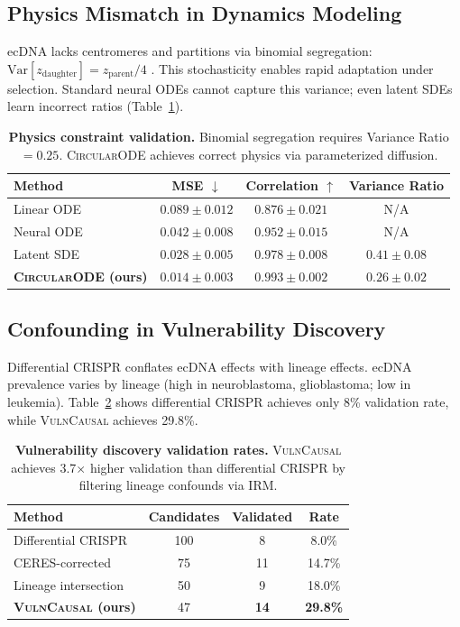 \documentclass{article}
\newcommand{\circularode}{\textsc{CircularODE}}
\newcommand{\vulncausal}{\textsc{VulnCausal}}
\begin{document}
\subsection{Physics Mismatch in Dynamics Modeling}
\label{sec:physics_mismatch}

ecDNA lacks centromeres and partitions via binomial segregation: $\text{Var}[z_{\text{daughter}}] = z_{\text{parent}}/4$ \citep{lange_2022_mathematical}. This stochasticity enables rapid adaptation under selection. Standard neural ODEs cannot capture this variance; even latent SDEs learn incorrect ratios (Table~\ref{tab:physics}).

\begin{table}[t]
\caption{\textbf{Physics constraint validation.} Binomial segregation requires Variance Ratio $= 0.25$. \circularode{} achieves correct physics via parameterized diffusion.}
\label{tab:physics}
\centering
\small
\begin{tabular}{@{}lccc@{}}
\toprule
Method & MSE $\downarrow$ & Correlation $\uparrow$ & Variance Ratio \\
\midrule
Linear ODE & $0.089 \pm 0.012$ & $0.876 \pm 0.021$ & N/A \\
Neural ODE & $0.042 \pm 0.008$ & $0.952 \pm 0.015$ & N/A \\
Latent SDE & $0.028 \pm 0.005$ & $0.978 \pm 0.008$ & $0.41 \pm 0.08$ \\
\textbf{\circularode{} (ours)} & $\mathbf{0.014 \pm 0.003}$ & $\mathbf{0.993 \pm 0.002}$ & $\mathbf{0.26 \pm 0.02}$ \\
\bottomrule
\end{tabular}
\end{table}

\subsection{Confounding in Vulnerability Discovery}
\label{sec:confounding}

Differential CRISPR conflates ecDNA effects with lineage effects. ecDNA prevalence varies by lineage (high in neuroblastoma, glioblastoma; low in leukemia). Table~\ref{tab:confounding} shows differential CRISPR achieves only 8\% validation rate, while \vulncausal{} achieves 29.8\%.

\begin{table}[t]
\caption{\textbf{Vulnerability discovery validation rates.} \vulncausal{} achieves 3.7$\times$ higher validation than differential CRISPR by filtering lineage confounds via IRM.}
\label{tab:confounding}
\centering
\small
\begin{tabular}{@{}lccc@{}}
\toprule
Method & Candidates & Validated & Rate \\
\midrule
Differential CRISPR & 100 & 8 & 8.0\% \\
CERES-corrected & 75 & 11 & 14.7\% \\
Lineage intersection & 50 & 9 & 18.0\% \\
\textbf{\vulncausal{} (ours)} & 47 & \textbf{14} & \textbf{29.8\%} \\
\bottomrule
\end{tabular}
\end{table}
\end{document}
